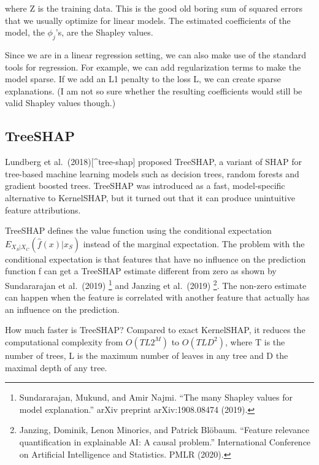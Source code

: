 \documentclass[
  10pt,
]{scrbook}
\begin{document}
where Z is the training data.
This is the good old boring sum of squared errors that we usually optimize for linear models.
The estimated coefficients of the model, the \(\phi_j\)'s, are the Shapley values.

Since we are in a linear regression setting, we can also make use of the standard tools for regression.
For example, we can add regularization terms to make the model sparse.
If we add an L1 penalty to the loss L, we can create sparse explanations.
(I am not so sure whether the resulting coefficients would still be valid Shapley values though.)

\hypertarget{treeshap}{%
\subsection{TreeSHAP}\label{treeshap}}

Lundberg et al.~(2018){[}\^{}tree-shap{]} proposed TreeSHAP, a variant of SHAP for tree-based machine learning models such as decision trees, random forests and gradient boosted trees.
TreeSHAP was introduced as a fast, model-specific alternative to KernelSHAP, but it turned out that it can produce unintuitive feature attributions.

TreeSHAP defines the value function using the conditional expectation \(E_{X_S|X_C}(\hat{f}(x)|x_S)\) instead of the marginal expectation.
The problem with the conditional expectation is that features that have no influence on the prediction function f can get a TreeSHAP estimate different from zero as shown by Sundararajan et al.~(2019) \footnote{Sundararajan, Mukund, and Amir Najmi. ``The many Shapley values for model explanation.'' arXiv preprint arXiv:1908.08474 (2019).} and Janzing et al.~(2019) \footnote{Janzing, Dominik, Lenon Minorics, and Patrick Blöbaum. ``Feature relevance quantification in explainable AI: A causal problem.'' International Conference on Artificial Intelligence and Statistics. PMLR (2020).}.
The non-zero estimate can happen when the feature is correlated with another feature that actually has an influence on the prediction.

How much faster is TreeSHAP?
Compared to exact KernelSHAP, it reduces the computational complexity from \(O(TL2^M)\) to \(O(TLD^2)\), where T is the number of trees, L is the maximum number of leaves in any tree and D the maximal depth of any tree.
\end{document}
